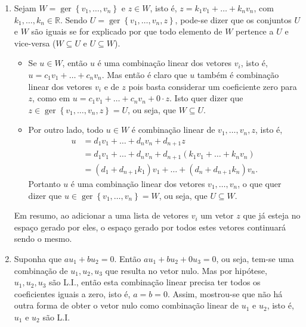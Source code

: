 \documentclass[12pt,a4paper]{article}
\newcommand*\ger[1]{\operatorname{ger}\left\{#1\right\}}
\newcommand*\R{\mathbb{R}}
\begin{document}
\begin{enumerate}
\item Sejam $W = \ger{ v_1, \ldots, v_n }$ e $z \in W$, isto é, $z = k_1 v_1 + \ldots + k_n v_n$, com $k_1, \ldots, k_n \in \R$. Sendo $U = \ger{ v_1, \ldots, v_n, z }$, pode-se dizer que os conjuntos $U$ e $W$ são iguais se for explicado por que todo elemento de $W$ pertence a $U$ e vice-versa ($W \subseteq U$ e $U \subseteq W$).
\begin{itemize}
\item 
Se $u \in W$, então $u$ é uma combinação linear dos vetores $v_i$, isto é, $u = c_1 v_1 + \ldots + c_n v_n$. Mas então é claro que $u$ também é combinação linear dos vetores $v_i$ e de $z$ pois basta considerar um coeficiente zero para $z$, como em $u = c_1 v_1 + \ldots + c_n v_n + 0 \cdot z$. Isto quer dizer que $z \in \ger{ v_1, \ldots, v_n, z } = U$, ou seja, que $W \subseteq U$.
\item Por outro lado, todo $u \in W$ é combinação linear de $v_1, \ldots, v_n, z$, isto é,
\begin{align*}
u
& = d_1 v_1 + \ldots + d_n v_n + d_{n+1} z \\
& = d_1 v_1 + \ldots + d_n v_n + d_{n+1}(k_1 v_1 + \ldots + k_n v_n) \\
& = (d_1 + d_{n+1}k_1) v_1 + \ldots + ( d_n + d_{n+1}k_n) v_n.
\end{align*}
Portanto $u$ é uma combinação linear dos vetores $v_1, \ldots, v_n$, o que quer dizer que $u \in \ger{ v_1, \ldots, v_n } = W$, ou seja, que $U \subseteq W$.
\end{itemize}
Em resumo, ao adicionar a uma lista de vetores $v_i$ um vetor $z$ que já esteja no espaço gerado por eles, o espaço gerado por todos estes vetores continuará sendo o mesmo.

\item Suponha que $a u_1 + bu_2 = 0$. Então $a u_1 + b u_2 + 0 u_3= 0$, ou seja, tem-se uma combinação de $u_1, u_2, u_3$ que resulta no vetor nulo. Mas por hipótese, $u_1, u_2, u_3$ são L.I., então esta combinação linear precisa ter todos os coeficientes iguais a zero, isto é, $a=b=0$. Assim, mostrou-se que não há outra forma de obter o vetor nulo como combinação linear de $u_1$ e $u_2$, isto é, $u_1$ e $u_2$ são L.I.


\end{enumerate}
\end{document}
